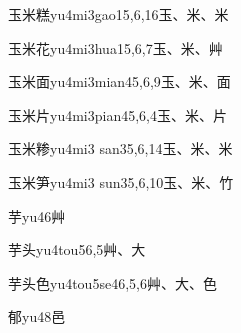 \begin{EntryWithPhonetic}{玉米糕}{yu4mi3gao1}{5,6,16}{⽟、⽶、⽶}
\end{EntryWithPhonetic}

\begin{EntryWithPhonetic}{玉米花}{yu4mi3hua1}{5,6,7}{⽟、⽶、⾋}
\end{EntryWithPhonetic}

\begin{EntryWithPhonetic}{玉米面}{yu4mi3mian4}{5,6,9}{⽟、⽶、⾯}
\end{EntryWithPhonetic}

\begin{EntryWithPhonetic}{玉米片}{yu4mi3pian4}{5,6,4}{⽟、⽶、⽚}
\end{EntryWithPhonetic}

\begin{EntryWithPhonetic}{玉米糁}{yu4mi3 san3}{5,6,14}{⽟、⽶、⽶}
\end{EntryWithPhonetic}

\begin{EntryWithPhonetic}{玉米笋}{yu4mi3 sun3}{5,6,10}{⽟、⽶、⽵}
\end{EntryWithPhonetic}

\begin{EntryWithPhonetic}{芋}{yu4}{6}{⾋}
\end{EntryWithPhonetic}

\begin{EntryWithPhonetic}{芋头}{yu4tou5}{6,5}{⾋、⼤}
\end{EntryWithPhonetic}

\begin{EntryWithPhonetic}{芋头色}{yu4tou5se4}{6,5,6}{⾋、⼤、⾊}
\end{EntryWithPhonetic}

\begin{EntryWithPhonetic}{郁}{yu4}{8}{⾢}
\end{EntryWithPhonetic}

